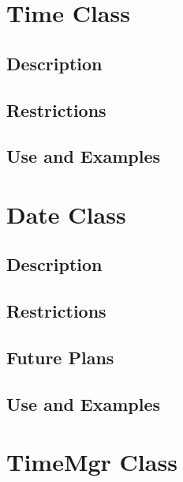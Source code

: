 \documentclass[]{article}
\begin{document}
%

\newpage
\section{Time Class}

\subsection{Description}


\subsection{Restrictions}


\subsection{Use and Examples}


\newpage
\section{Date Class}

\subsection{Description}


\subsection{Restrictions}


\subsection{Future Plans}


\subsection{Use and Examples}


\newpage
\section{TimeMgr Class}
\end{document}
